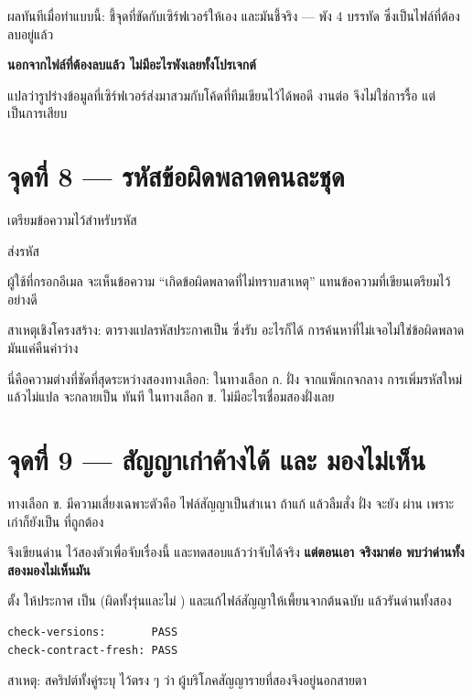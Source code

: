 ผลทันทีเมื่อทำแบบนี้:  ชี้จุดที่ขัดกับเซิร์ฟเวอร์ให้เอง และมันชี้จริง ---
 พัง 4 บรรทัด ซึ่งเป็นไฟล์ที่ต้องลบอยู่แล้ว

\begin{goodbox}[title={ผลที่สำคัญกว่านั้น}]
\textbf{นอกจากไฟล์ที่ต้องลบแล้ว ไม่มีอะไรพังเลยทั้งโปรเจกต์}

แปลว่ารูปร่างข้อมูลที่เซิร์ฟเวอร์ส่งมาสวมกับโค้ดที่ทีมเขียนไว้ได้พอดี
งานต่อ  จึงไม่ใช่การรื้อ แต่เป็นการเสียบ
\end{goodbox}

\section{จุดที่ 8 --- รหัสข้อผิดพลาดคนละชุด}

 เตรียมข้อความไว้สำหรับรหัส

 ส่งรหัส 

\begin{badbox}[title={คนละรหัส ทั้งสองฝั่ง \en{build} ผ่าน ไม่มีใครเตือน}]
ผู้ใช้ที่กรอกอีเมล  จะเห็นข้อความ ``เกิดข้อผิดพลาดที่ไม่ทราบสาเหตุ''
แทนข้อความที่เขียนเตรียมไว้อย่างดี

สาเหตุเชิงโครงสร้าง: ตารางแปลรหัสประกาศเป็น 
ซึ่งรับ  อะไรก็ได้ การค้นหาที่ไม่เจอไม่ใช่ข้อผิดพลาด มันแค่คืนค่าว่าง
\end{badbox}

นี่คือความต่างที่ชัดที่สุดระหว่างสองทางเลือก: ในทางเลือก ก. ฝั่ง 
 จากแพ็กเกจกลาง การเพิ่มรหัสใหม่แล้วไม่แปล
จะกลายเป็น  ทันที ในทางเลือก ข. ไม่มีอะไรเชื่อมสองฝั่งเลย

\section{จุดที่ 9 --- สัญญาเก่าค้างได้ และ  มองไม่เห็น}

ทางเลือก ข. มีความเสี่ยงเฉพาะตัวคือ ไฟล์สัญญาเป็นสำเนา ถ้าแก้ 
แล้วลืมสั่ง  ฝั่ง  จะยัง  ผ่าน
เพราะ  เก่าก็ยังเป็น  ที่ถูกต้อง

 จึงเขียนด่าน  ไว้สองตัวเพื่อจับเรื่องนี้ และทดสอบแล้วว่าจับได้จริง
\textbf{แต่ตอนเอา  จริงมาต่อ พบว่าด่านทั้งสองมองไม่เห็นมัน}

\begin{badbox}[title={\ptwo\ ทดลองทำให้พังแล้ว ด่านยังเขียวทั้งคู่}]
ตั้ง  ให้ประกาศ  เป็น 
(ผิดทั้งรุ่นและไม่ ) และแก้ไฟล์สัญญาให้เพี้ยนจากต้นฉบับ แล้วรันด่านทั้งสอง

\begin{lstlisting}
check-versions:       PASS
check-contract-fresh: PASS
\end{lstlisting}
\vspace{-0.4em}
สาเหตุ: สคริปต์ทั้งคู่ระบุ  ไว้ตรง ๆ ว่า 
ผู้บริโภคสัญญารายที่สองจึงอยู่นอกสายตา
\end{badbox}

